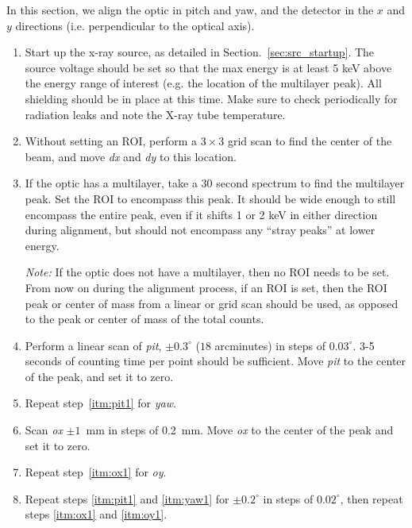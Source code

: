 In this section, we align the optic in pitch and yaw, and the detector in the $x$ and $y$ directions (i.e. perpendicular to the optical axis).

\begin{enumerate}

\item Start up the x-ray source, as detailed in Section.~\ref{sec:src_startup}. The source voltage should be set so that the max energy is at least 5 keV above the energy range of interest (e.g. the location of the multilayer peak). All shielding should be in place at this time. Make sure to check periodically for radiation leaks and note the X-ray tube temperature.

\item Without setting an ROI, perform a $3\times3$ grid scan to find the center of the beam, and move \textit{dx} and \textit{dy} to this location.

\item If the optic has a multilayer, take a 30 second spectrum to find the multilayer peak. Set the ROI to encompass this peak. It should be wide enough to still encompass the entire peak, even if it shifts 1 or 2 keV in either direction during alignment, but should not encompass any ``stray peaks'' at lower energy.

\textit{Note:} If the optic does not have a multilayer, then no ROI needs to be set. From now on during the alignment process, if an ROI is set, then the ROI peak or center of mass from a linear or grid scan should be used, as opposed to the peak or center of mass of the total counts.

\item \label{itm:pit1} Perform a linear scan of \textit{pit}, $\pm 0.3 ^\circ$ ($18$ arcminutes) in steps of $0.03^\circ$. 3-5 seconds of counting time per point should be sufficient. Move \textit{pit} to the center of the peak, and set it to zero.

\item \label{itm:yaw1} Repeat step~\ref{itm:pit1} for \textit{yaw}.

\item \label{itm:ox1} Scan \textit{ox} $\pm 1$~mm in steps of 0.2~mm. Move \textit{ox} to the center of the peak and set it to zero.

\item \label{itm:oy1} Repeat step~\ref{itm:ox1} for \textit{oy}.

\item Repeat steps \ref{itm:pit1} and \ref{itm:yaw1} for $\pm 0.2 ^\circ$ in steps of $0.02^\circ$, then repeat steps \ref{itm:ox1} and \ref{itm:oy1}.


\end{enumerate}
